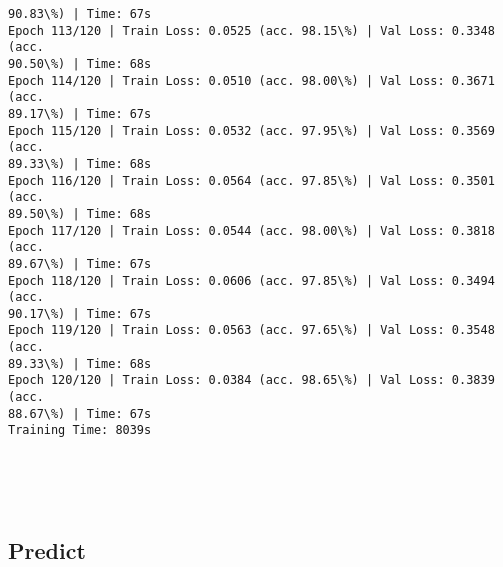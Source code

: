 \documentclass[8pt]{extarticle}
\begin{document}
\begin{Verbatim}[commandchars=\\\{\}]
90.83\%) | Time: 67s
Epoch 113/120 | Train Loss: 0.0525 (acc. 98.15\%) | Val Loss: 0.3348 (acc.
90.50\%) | Time: 68s
Epoch 114/120 | Train Loss: 0.0510 (acc. 98.00\%) | Val Loss: 0.3671 (acc.
89.17\%) | Time: 67s
Epoch 115/120 | Train Loss: 0.0532 (acc. 97.95\%) | Val Loss: 0.3569 (acc.
89.33\%) | Time: 68s
Epoch 116/120 | Train Loss: 0.0564 (acc. 97.85\%) | Val Loss: 0.3501 (acc.
89.50\%) | Time: 68s
Epoch 117/120 | Train Loss: 0.0544 (acc. 98.00\%) | Val Loss: 0.3818 (acc.
89.67\%) | Time: 67s
Epoch 118/120 | Train Loss: 0.0606 (acc. 97.85\%) | Val Loss: 0.3494 (acc.
90.17\%) | Time: 67s
Epoch 119/120 | Train Loss: 0.0563 (acc. 97.65\%) | Val Loss: 0.3548 (acc.
89.33\%) | Time: 68s
Epoch 120/120 | Train Loss: 0.0384 (acc. 98.65\%) | Val Loss: 0.3839 (acc.
88.67\%) | Time: 67s
Training Time: 8039s
    \end{Verbatim}

    \begin{center}
    \end{center}
    { \hspace*{\fill} \\}
    
    \begin{center}
    \end{center}
    { \hspace*{\fill} \\}
    
    \subsection{Predict}\label{predict}
\end{document}
